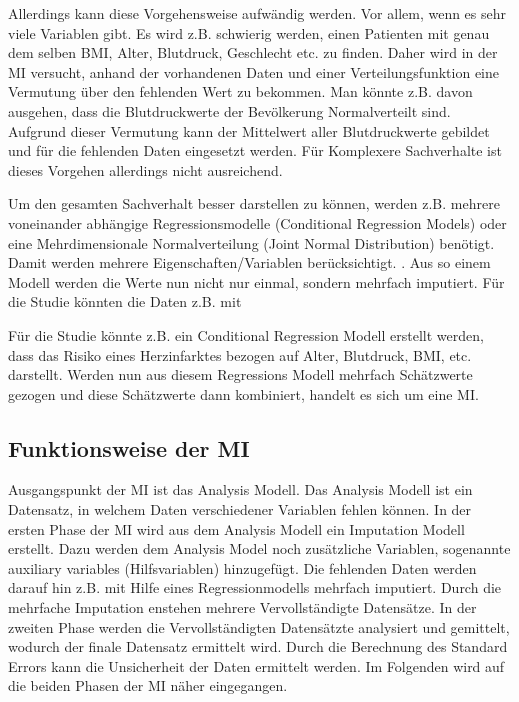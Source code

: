 Allerdings kann diese Vorgehensweise aufwändig werden. Vor allem, wenn es sehr viele Variablen gibt. Es wird z.B. 
schwierig werden, einen Patienten mit genau dem selben BMI, Alter, Blutdruck, Geschlecht etc. zu finden. Daher wird in 
der MI versucht, anhand der vorhandenen Daten und einer Verteilungsfunktion eine Vermutung über den fehlenden Wert zu 
bekommen. Man könnte z.B. davon ausgehen, dass die Blutdruckwerte der Bevölkerung Normalverteilt sind. Aufgrund dieser Vermutung 
kann der Mittelwert aller Blutdruckwerte gebildet und für die fehlenden Daten eingesetzt werden. Für Komplexere Sachverhalte ist 
dieses Vorgehen allerdings nicht ausreichend. \autocite[1089]{Donders2006}


Um den gesamten Sachverhalt besser darstellen zu können, werden z.B. mehrere voneinander abhängige Regressionsmodelle 
(Conditional Regression Models) oder eine Mehrdimensionale Normalverteilung (Joint Normal Distribution) benötigt. Damit 
werden mehrere Eigenschaften/Variablen berücksichtigt. \autocite[164]{Lee2014}.  Aus so einem Modell werden die 
Werte nun nicht nur einmal, sondern mehrfach imputiert. Für die Studie könnten die Daten z.B. mit  

Für die Studie könnte z.B. ein Conditional Regression Modell erstellt 
werden, dass das Risiko eines Herzinfarktes bezogen auf Alter, Blutdruck, BMI, etc. darstellt. 
Werden nun aus diesem Regressions Modell mehrfach Schätzwerte gezogen und diese Schätzwerte dann kombiniert, handelt es sich um eine MI. 


\subsection{Funktionsweise der MI}

Ausgangspunkt der MI ist das Analysis Modell. Das Analysis Modell ist ein Datensatz, in welchem Daten verschiedener Variablen 
fehlen können. In der ersten Phase der MI wird aus dem Analysis Modell ein Imputation Modell erstellt. Dazu werden dem 
Analysis Model noch zusätzliche Variablen, sogenannte auxiliary variables (Hilfsvariablen) hinzugefügt. Die fehlenden 
Daten werden darauf hin z.B. mit Hilfe eines Regressionmodells mehrfach imputiert. Durch die mehrfache Imputation enstehen 
mehrere Vervollständigte Datensätze. In der zweiten Phase werden die Vervollständigten Datensätzte analysiert und gemittelt, 
wodurch der finale Datensatz ermittelt wird. Durch die Berechnung des Standard Errors kann die Unsicherheit der Daten 
ermittelt werden. \autocite[163]{Lee2014} Im Folgenden wird auf die beiden Phasen der MI näher eingegangen.


